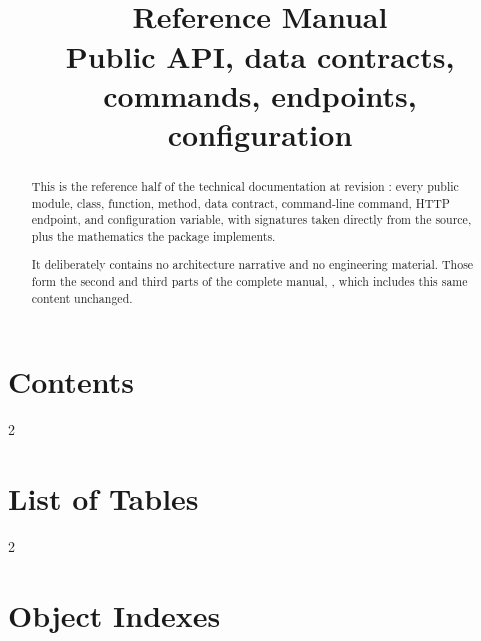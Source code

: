 \documentclass[10pt,a4paper,oneside]{report}
\title{%
  \Huge \projectname \\[6pt]
  \Large Reference Manual \\[10pt]
  \normalsize Public API, data contracts, commands, endpoints, configuration
}
\begin{document}
\maketitle

\begin{abstract}
\noindent
This is the reference half of the \projectname{} technical documentation at
revision \texttt{\projectrevision}: every public module, class, function,
method, data contract, command-line command, HTTP endpoint, and configuration
variable, with signatures taken directly from the source, plus the mathematics
the package implements.

It deliberately contains no architecture narrative and no engineering
material. Those form the second and third parts of the complete manual,
, which includes this same content unchanged.
\end{abstract}

\cleardoublepage
{}
\chapter*{Contents}
\begin{multicols}{2}\small
\makeatletter{}\makeatother
\end{multicols}

\chapter*{List of Tables}
\begin{multicols}{2}\small
\makeatletter{}\makeatother
\end{multicols}



\appendix

\chapter{Object Indexes}
\label{app:reference-indexes}





\cleardoublepage
{}
\printindex
\end{document}
